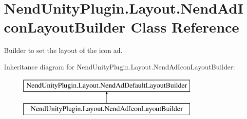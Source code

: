 \hypertarget{class_nend_unity_plugin_1_1_layout_1_1_nend_ad_icon_layout_builder}{}\section{Nend\+Unity\+Plugin.\+Layout.\+Nend\+Ad\+Icon\+Layout\+Builder Class Reference}
\label{class_nend_unity_plugin_1_1_layout_1_1_nend_ad_icon_layout_builder}


Builder to set the layout of the icon ad.  


Inheritance diagram for Nend\+Unity\+Plugin.\+Layout.\+Nend\+Ad\+Icon\+Layout\+Builder\+:\begin{figure}[H]
\begin{center}
\leavevmode
\includegraphics[height=2.000000cm]{class_nend_unity_plugin_1_1_layout_1_1_nend_ad_icon_layout_builder}
\end{center}
\end{figure}
